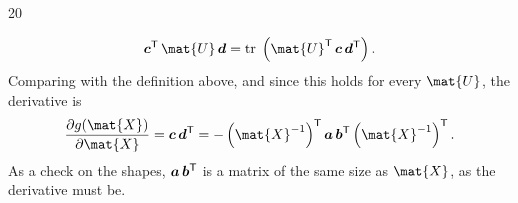 \documentclass{sotonExamBoxes}    %
\begin{document}
\begin{question}{20}
\begin{qparts}
{\begin{answer}
\begin{align*}
          \bm{c}^\tr\, \mat{U}\, \bm{d}
          = \Tr\bra{\strut \mat{U}^\tr\, \bm{c}\, \bm{d}^\tr} .
        \end{align*}
        Comparing with the definition above, and since this holds for
        every $\mat{U}$, the derivative is
        \begin{align*}
          \frac{\partial g(\mat{X})}{\partial \mat{X}}
          = \bm{c}\,\bm{d}^\tr
          = -\bra{\mat{X}^{-1}}^\tr \bm{a}\, \bm{b}^\tr
             \bra{\mat{X}^{-1}}^\tr .
        \end{align*}
        As a check on the shapes, $\bm{a}\,\bm{b}^{\textsf{T}}$ is a matrix of the
        same size as $\mat{X}$, as the derivative must be.
      \end{answer}}{}

  \end{qparts}
\end{question}


\end{document}
